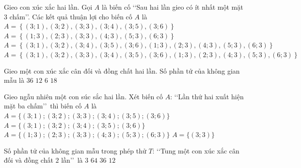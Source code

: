 \begin{ex}%
	Gieo con xúc xắc hai lần. Gọi $ A $ là biến cố \lq\lq Sau hai lần gieo có ít nhất một mặt $ 3 $ chấm\rq\rq. Các kết quả thuận lợi cho  biến cố $ A $ là
	\choice 
		 {$ A=\left\lbrace (3;1),(3;2),(3;3),(3;4),(3;5),(3;6)\right\rbrace $}
		{$ A=\left\lbrace  (1;3),(2;3),(3;3),(4;3),(5;3),(6;3)\right\rbrace $}
		{$  A=\left\lbrace (3;1),(3;2),(3;4),(3;5),(3;6),(1;3),(2;3),(4;3),(5;3),(6;3)\right\rbrace $}
		{\True $ A=\left\lbrace (3;1),(3;2),(3;3),(3;4),(3;5),(3;6),(1;3),(2;3),(4;3),(5;3),(6;3)\right\rbrace $} 
\end{ex}

\begin{ex}%
	Gieo một con xúc xắc cân đối và đồng chất hai lần. Số phần tử của không gian mẫu  là
	\choice 
		{\True  $36$}
		 {$12$}
		 {$6$}
		{$18$} 
\end{ex}

\begin{ex}%
	 Gieo ngẫu nhiên một con súc sắc hai lần. Xét biến cố $A$: \lq\lq Lần thứ hai xuất hiện mặt ba chấm\rq\rq\ thì biến cố $A$ là
	 \choice
		{$A=\{(3;1);(3;2);(3;3);(3;4);(3;5);(3;6)\}$} 
		{$A=\{(3;1);(3;2);(3;4);(3;5);(3;6)\}$} 
		{\True $A=\{(1;3);(2;3);(3;3);(4;3);(5;3);(6;3)\}$} 
		{$A=\{(3;3)\}$} 
\end{ex}

\begin{ex}%
	Số phần tử của không gian mẫu trong phép thử  $T$: \lq\lq Tung một con xúc xắc cân đối và đồng chất $2$ lần\rq\rq\, là
	\choice 
		{$3$} 
		{$64$} 
		{\True  $36$}
		 {$12$}
\end{ex}

